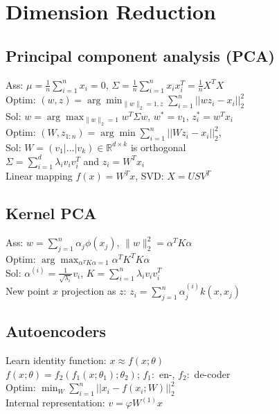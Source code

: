 \section*{\normalsize{Dimension Reduction}}
\subsection*{Principal component analysis (PCA)}
Ass: $\mu =\frac{1}{n}\sum_{i = 1}^n x_i = 0$,   $\Sigma = \frac{1}{n}\sum_{i=1}^n x_i x_i^T = \frac{1}{n}X^TX$\\
Optim: $(w,z)=\arg \min_{\|w \|_2 =1, z} \sum_{i=1}^n || w z_i  - x_i||_2^2$\\
Sol: $ w = \arg \max_{\|w\|_2=1} w^T\Sigma w$, $w^* = v_1$, $z^*_i = w^Tx_i $\\
Optim: $(W,z_{1:n}) = \arg \min \sum_{i=1}^n ||W z_i - x_i||_2^2$,\\
Sol: $W = (v_1|...|v_k) \in \mathds{R}^{d\times k}$ is orthogonal \\
$\Sigma = \sum_{i=1}^d \lambda_i v_i v_i^T$ and $z_i = W^T x_i$\\
Linear mapping $f(x)=W^Tx$, SVD: $X=USV^T$

\subsection*{Kernel PCA}
Ass: $w=\sum_{j=1}^n \alpha_j \phi(x_j)$, $\|w\|_2^2 = \alpha^T K \alpha $\\
Optim: $ \arg\max_{\alpha^T K \alpha =1} \alpha^T K^T K \alpha$\\
Sol: $\alpha^{(i)}=\frac{1}{\sqrt{\lambda_i}}v_i$, $K=\sum_{i=1}^n \lambda_iv_iv_i^T $\\
New point $x$ projection as $z$: $z_i = \sum_{j=1}^n\alpha_j^{(i)}k(x,x_j)$

\subsection*{Autoencoders}
Learn identity function: $x \approx f(x;\theta)$\\
$f(x;\theta) = f_2(f_1(x;\theta_1);\theta_2)$; $f_1:$ en-, $f_2:$ de-coder\\
Optim: $ \min_W \sum_{i=1}^n||x_i-f(x_i;W)||_2^2$\\
Internal representation: $v=\varphi W^{(1)} x $